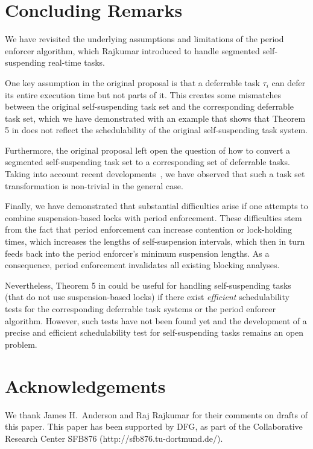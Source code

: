 
\section{Concluding Remarks}
\label{sec:conclusion}

We have revisited the underlying assumptions and limitations of the period enforcer algorithm, which Rajkumar \cite{Raj:suspension1991} introduced to handle segmented self-suspending real-time tasks. 

One key assumption in the original proposal \cite{Raj:suspension1991} is that a deferrable task $\tau_i$ can defer its entire execution time but not parts of it. This creates some mismatches between the original self-suspending task set and the corresponding deferrable task set, which we have demonstrated with an example that shows that Theorem 5 in \cite{Raj:suspension1991} does not reflect the schedulability of the original self-suspending task system. 


Furthermore, the original proposal \cite{Raj:suspension1991} left open the question of how to convert a segmented self-suspending task set to a corresponding set of deferrable tasks. Taking into account recent developments~\cite{ecrts15nelissen}, we have observed that such a task set transformation is non-trivial in the general case.  

Finally, we have demonstrated that substantial difficulties arise if one attempts to combine suspension-based locks with period enforcement. These difficulties stem from the fact that period enforcement can increase contention or lock-holding times, which increases the lengths of self-suspension intervals, which then in turn feeds back into the period enforcer's minimum suspension lengths. As a consequence, period enforcement invalidates all existing blocking analyses.

Nevertheless, Theorem 5 in \cite{Raj:suspension1991} could be useful for handling self-suspending tasks (that do not use suspension-based locks) if there exist \emph{efficient} schedulability tests for the corresponding deferrable task systems or the period enforcer algorithm. However, such tests have not been found yet and the development of a precise and efficient schedulability test for self-suspending tasks remains an open problem.


\section*{Acknowledgements}

We thank James H.\ Anderson and Raj Rajkumar for their comments on drafts of this paper.
This paper has been supported by DFG, as part of the Collaborative
Research Center SFB876 (http://sfb876.tu-dortmund.de/).